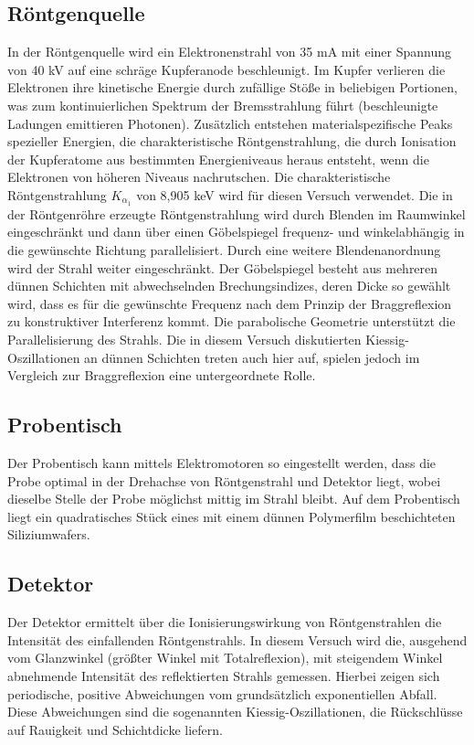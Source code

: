 \documentclass[12pt]{article}
\begin{document}
\subsection{Röntgenquelle}
In der Röntgenquelle wird ein Elektronenstrahl von 35 mA mit einer Spannung von 40 kV auf eine schräge Kupferanode beschleunigt. Im Kupfer verlieren die Elektronen ihre kinetische Energie durch zufällige Stöße in beliebigen Portionen, was zum kontinuierlichen Spektrum der Bremsstrahlung führt (beschleunigte Ladungen emittieren Photonen). Zusätzlich entstehen materialspezifische Peaks spezieller Energien, die charakteristische Röntgenstrahlung, die durch Ionisation der Kupferatome aus bestimmten Energieniveaus heraus entsteht, wenn die Elektronen von höheren Niveaus nachrutschen. Die charakteristische Röntgenstrahlung $K_{\alpha_1}$ von 8,905 keV wird für diesen Versuch verwendet.
Die in der Röntgenröhre erzeugte Röntgenstrahlung wird durch Blenden im Raumwinkel eingeschränkt und dann über einen Göbelspiegel frequenz- und winkelabhängig in die gewünschte Richtung parallelisiert. Durch eine weitere Blendenanordnung wird der Strahl weiter eingeschränkt. Der Göbelspiegel besteht aus mehreren dünnen Schichten mit abwechselnden Brechungsindizes, deren Dicke so gewählt wird, dass es für die gewünschte Frequenz nach dem Prinzip der Braggreflexion zu konstruktiver Interferenz kommt. Die parabolische Geometrie unterstützt die Parallelisierung des Strahls. Die in diesem Versuch diskutierten Kiessig-Oszillationen an dünnen Schichten treten auch hier auf, spielen jedoch im Vergleich zur Braggreflexion eine untergeordnete Rolle.
\subsection{Probentisch}
Der Probentisch kann mittels Elektromotoren so eingestellt werden, dass die Probe optimal in der Drehachse von Röntgenstrahl und Detektor liegt, wobei dieselbe Stelle der Probe möglichst mittig im Strahl bleibt. Auf dem Probentisch liegt ein quadratisches Stück eines mit einem dünnen Polymerfilm beschichteten Siliziumwafers.
\subsection{Detektor}
Der Detektor ermittelt über die Ionisierungswirkung von Röntgenstrahlen die Intensität des einfallenden Röntgenstrahls.
In diesem Versuch wird die, ausgehend vom Glanzwinkel (größter Winkel mit Totalreflexion), mit steigendem Winkel abnehmende Intensität des reflektierten Strahls gemessen. Hierbei zeigen sich periodische, positive Abweichungen vom grundsätzlich exponentiellen Abfall. Diese Abweichungen sind die sogenannten Kiessig-Oszillationen, die Rückschlüsse auf Rauigkeit und Schichtdicke liefern.
\end{document}
